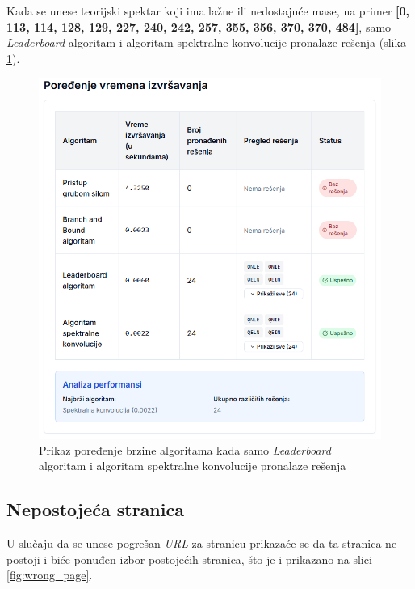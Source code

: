 \documentclass[12pt,oneside]{memoir}
\begin{document}
Kada se unese teorijski spektar koji ima lažne ili nedostajuće mase, na primer \textbf{[0, 113, 114, 128, 129, 227, 240, 242, 257, 355, 356, 370, 370, 484]}, samo \emph{Leaderboard} algoritam i algoritam spektralne konvolucije pronalaze rešenja (slika \ref{fig:comparison}).
\begin{figure}[H]
\centering
\includegraphics[width=1\textwidth]{images/comparison.png}
\caption{Prikaz poređenje brzine algoritama kada samo \emph{Leaderboard} algoritam i algoritam spektralne konvolucije pronalaze rešenja}
\label{fig:comparison}
\end{figure}

\subsection{Nepostojeća stranica}

U slučaju da se unese pogrešan \emph{URL} za stranicu prikazaće se da ta stranica ne postoji i biće ponuđen izbor postojećih stranica, što je i prikazano na slici \ref{fig:wrong_page}.
\end{document}
